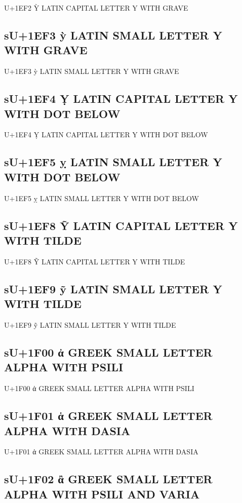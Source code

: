 U+1EF2 Ỳ LATIN CAPITAL LETTER Y WITH GRAVE

\subsection{sU+1EF3 ỳ LATIN SMALL LETTER Y WITH GRAVE}

U+1EF3 ỳ LATIN SMALL LETTER Y WITH GRAVE

\subsection{sU+1EF4 Ỵ LATIN CAPITAL LETTER Y WITH DOT BELOW}

U+1EF4 Ỵ LATIN CAPITAL LETTER Y WITH DOT BELOW

\subsection{sU+1EF5 ỵ LATIN SMALL LETTER Y WITH DOT BELOW}

U+1EF5 ỵ LATIN SMALL LETTER Y WITH DOT BELOW

\subsection{sU+1EF8 Ỹ LATIN CAPITAL LETTER Y WITH TILDE}

U+1EF8 Ỹ LATIN CAPITAL LETTER Y WITH TILDE

\subsection{sU+1EF9 ỹ LATIN SMALL LETTER Y WITH TILDE}

U+1EF9 ỹ LATIN SMALL LETTER Y WITH TILDE

\iftestgreek

\subsection{sU+1F00 ἀ GREEK SMALL LETTER ALPHA WITH PSILI}

U+1F00 ἀ GREEK SMALL LETTER ALPHA WITH PSILI

\subsection{sU+1F01 ἁ GREEK SMALL LETTER ALPHA WITH DASIA}

U+1F01 ἁ GREEK SMALL LETTER ALPHA WITH DASIA

\subsection{sU+1F02 ἂ GREEK SMALL LETTER ALPHA WITH PSILI AND VARIA}

